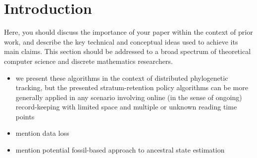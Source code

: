 \section{Introduction} \label{sec:introduction}

Here, you should discuss the importance of your paper within the context of prior work, and describe the key technical and conceptual ideas used to achieve its main claims. This section should be addressed to a broad spectrum of theoretical computer science and discrete mathematics researchers.

\begin{itemize}
\item we present these algorithms in the context of distributed phylogenetic tracking, but the presented stratum-retention policy algorithms can be more generally applied in any scenario involving online (in the sense of ongoing) record-keeping with limited space and multiple or unknown reading time points
\item mention data loss
\item mention potential fossil-based approach to ancestral state estimation
\end{itemize}
